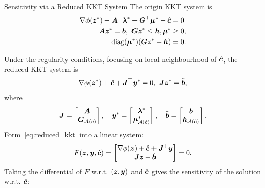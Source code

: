\documentclass[10pt,aspectratio=169,xcolor=dvipsnames]{beamer}
\begin{document}
\begin{frame}[allowframebreaks]{Sensitivity via a Reduced KKT System}
    The origin KKT system is
    \begin{equation}
        \begin{aligned}
            \nabla \phi({\bm{z}}^*) + {\bm{A}}^\top {\bm{\lambda}}^* + {\bm{G}}^\top {\bm{\mu}}^* + \hat{{\bm{c}}} &= 0\\
            {\bm{A}} {\bm{z}}^* = {\bm{b}}, ~ {\bm{G}} {\bm{z}}^* \leq {\bm{h}} , {\bm{\mu}}^* &\geq 0, \\~ \operatorname{diag}({\bm{\mu}}^*) ({\bm{G}} {\bm{z}}^* - {\bm{h}}) &= 0.
        \end{aligned}
    \end{equation}

    Under the regularity conditions, focusing on local neighbourhood of $\hat{{\bm{c}}}$, the reduced KKT system is
    \begin{equation}\label{eq:reduced_kkt}
        \nabla \phi({\bm{z}}^*) + \hat{{\bm{c}}} + {\bm{J}}^\top {\bm{y}}^* = 0 , ~ {\bm{J}} {\bm{z}}^* = \tilde{{\bm{b}}},
    \end{equation}
    where
    \begin{equation}
        {\bm{J}} = \begin{bmatrix}
            {\bm{A}}\\
            {\bm{G}}_{\mathcal{A}(\hat{{\bm{c}}})}
        \end{bmatrix},\quad
        {\bm{y}}^* = \begin{bmatrix}
            {\bm{\lambda}}^*\\
            {\bm{\mu}}^*_{\mathcal{A}(\hat{{\bm{c}}})}
        \end{bmatrix},\quad
        \tilde{{\bm{b}}} = \begin{bmatrix}
            {\bm{b}}\\
            {\bm{h}}_{\mathcal{A}(\hat{{\bm{c}}})}
        \end{bmatrix}.
    \end{equation}
    Form~\eqref{eq:reduced_kkt} into a linear system:
    \begin{equation}
        F({\bm{z}}, {\bm{y}}, \hat{{\bm{c}}}) = \begin{bmatrix}
            \nabla \phi({\bm{z}}) + \hat{{\bm{c}}} + {\bm{J}}^\top {\bm{y}}\\
            {\bm{J}} {\bm{z}} - \tilde{{\bm{b}}}
        \end{bmatrix} = 0.
    \end{equation}
    Taking the differential of $F$ w.r.t. $({\bm{z}}, {\bm{y}})$ and $\hat{{\bm{c}}}$ gives the sensitivity of the solution w.r.t. $\hat{{\bm{c}}}$:
    \begin{equation}\label{eq:reduced_kkt_linear}
        \boxed{
}
\end{equation}
\end{frame}
\end{document}
